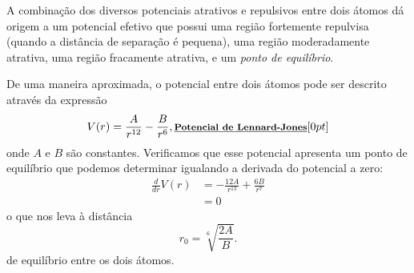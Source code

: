 \begin{marginfigure}[-7cm]
\centering
{}
\caption{A combinação dos diversos potenciais atrativos e repulsivos entre dois átomos dá origem a um potencial efetivo que possui uma região fortemente repulvisa (quando a distância de separação é pequena), uma região moderadamente atrativa, uma região fracamente atrativa, e um \emph{ponto de equilíbrio}. \label{Fig:PotLennardJones}}
\end{marginfigure}

De uma maneira aproximada, o potencial entre dois átomos pode ser descrito através da expressão
\begin{equation}
    V(r) = \frac{A}{r^{12}} - \frac{B}{r^{6}}, \relax{\footnotesize\emph{\textbf{Potencial de Lennard-Jones}}}[0pt]
\end{equation}
%
onde $A$ e $B$ são constantes. Verificamos que esse potencial apresenta um ponto de equilíbrio que podemos determinar igualando a derivada do potencial a zero:
\begin{align}
    \frac{d}{dr}V(r) &= -\frac{12A}{r^{13}} + \frac{6B}{r^7} \\
    &= 0
\end{align}
%
o que nos leva à distância
\begin{equation}
    r_0 = \sqrt[6]{\frac{2A}{B}}.
\end{equation}
%
de equilíbrio entre os dois átomos.


